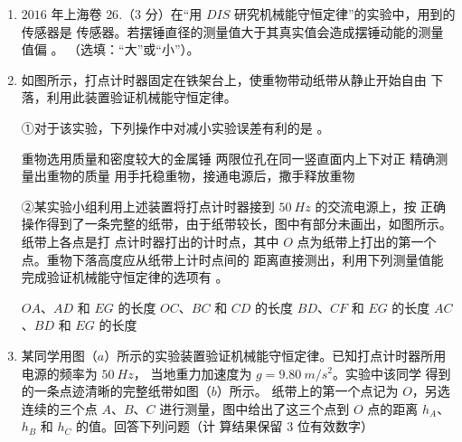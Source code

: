 \begin{enumerate}
\renewcommand{\labelenumi}{\arabic{enumi}.}
\item
$ 2016 $ 年上海卷 $ 26 $.（$ 3 $ 分）在“用 $ DIS $ 研究机械能守恒定律”的实验中，用到的传感器是
传感器。若摆锤直径的测量值大于其真实值会造成摆锤动能的测量值偏
。
（选填：“大”或“小”）。







\item
{}
如图所示，打点计时器固定在铁架台上，使重物带动纸带从静止开始自由
下落，利用此装置验证机械能守恒定律。

①对于该实验，下列操作中对减小实验误差有利的是  。
\begin{figure}[h!]
\centering

\end{figure}


\fourchoices
{重物选用质量和密度较大的金属锤}
{两限位孔在同一竖直面内上下对正}
{精确测量出重物的质量}
{用手托稳重物，接通电源后，撒手释放重物}


②某实验小组利用上述装置将打点计时器接到 $ 50 \ Hz $ 的交流电源上，按
正确操作得到了一条完整的纸带，由于纸带较长，图中有部分未画出，如图所示。纸带上各点是打
点计时器打出的计时点，其中 $ O $ 点为纸带上打出的第一个点。重物下落高度应从纸带上计时点间的
距离直接测出，利用下列测量值能完成验证机械能守恒定律的选项有  。
\begin{figure}[h!]
\centering

\end{figure}

\fourchoices
{$ OA $、$ AD $ 和 $ EG $ 的长度}
{$ OC $、$ BC $ 和 $ CD $ 的长度}
{$ BD $、$ CF $ 和 $ EG $ 的长度}
{$ AC $、$ BD $ 和 $ EG $ 的长度}





\newpage

\item
{}
某同学用图（$ a $）所示的实验装置验证机械能守恒定律。已知打点计时器所用电源的频率为 $ 50 \ Hz $，
当地重力加速度为 $ g=9.80 \ m/s^{2} $。实验中该同学
得到的一条点迹清晰的完整纸带如图（$ b $）所示。
纸带上的第一个点记为 $ O $，另选连续的三个点
$ A $、$ B $、$ C $ 进行测量，图中给出了这三个点到 $ O $
点的距离 $ h_{A} $、$ h_{B} $ 和 $ h_{C} $ 的值。回答下列问题（计
算结果保留 $ 3 $ 位有效数字）
\begin{figure}[h!]
\centering

\end{figure}



\end{enumerate}
